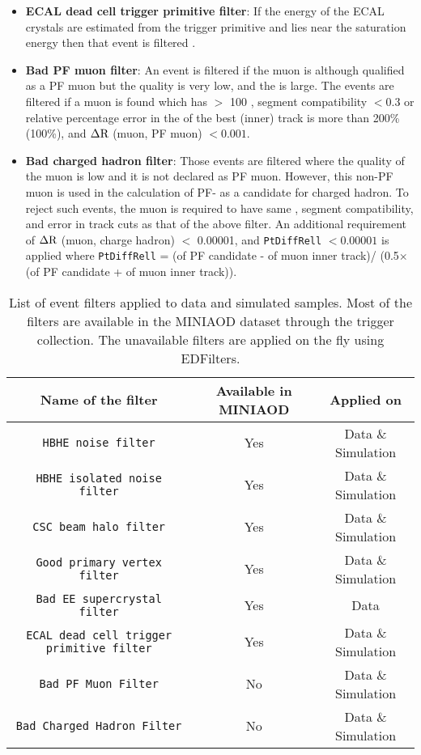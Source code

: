 \begin{itemize}[leftmargin=*]
	\item \textbf{ECAL dead cell trigger primitive filter}: If the energy of
		the ECAL crystals are estimated from the trigger primitive and
		lies near the saturation energy then that event is filtered
		\cite{metFilters}.
	\item \textbf{Bad PF muon filter}: An event is filtered if the muon is
		although qualified as a PF muon but the quality is very low, and
		the \pt is large. The events are filtered if a muon is found
		which has \pt $>$ 100 \GeV, segment compatibility $< 0.3$ or relative
		percentage error in the \pt of the best (inner) track is more than
		200\% (100\%), and $\Delta \rm R$ (muon, PF muon) $< 0.001$.
	\item \textbf{Bad charged hadron filter}: Those events are filtered where
		the quality of the muon is low and it is not declared as PF muon.
		However, this non-PF muon is used in the calculation of PF-\MET
		as a candidate for charged hadron. To reject such events, the muon
		is required to have same \pt, segment compatibility, and error in
		track cuts as that of the above filter. An additional requirement
    of $\Delta \rm R$ (muon, charge hadron) $<$ 0.00001, and \verb|PtDiffRell|
		$< 0.00001$ is applied where \verb|PtDiffRell| =
		(\pt of PF candidate - \pt of muon inner track)/
		(0.5$\times$ (\pt of PF candidate + \pt of muon inner track)).
\end{itemize}

\begin{table}
\caption{ List of event filters applied to data and simulated samples. Most of the filters
	are available in the MINIAOD dataset through the trigger collection. The
	unavailable filters are applied on the fly using EDFilters.}
\label{tab:eventFilters}
\centering
\begin{adjustbox}{max width=\textwidth}
 \begin{tabular}{ccc}\hline\hline
  {\bf{Name of the filter}} & {\bf{Available in MINIAOD}} & {\bf{Applied on}}\\\hline\hline
  \verb|HBHE noise filter|            & Yes & Data \& Simulation \\
  \verb|HBHE isolated noise filter|   & Yes & Data \& Simulation \\
  \verb|CSC beam halo filter|         & Yes & Data \& Simulation \\
  \verb|Good primary vertex filter|   & Yes & Data \& Simulation \\
  \verb|Bad EE supercrystal filter|   & Yes & Data  \\
  \verb|ECAL dead cell trigger primitive filter| & Yes & Data \& Simulation\\
  \verb|Bad PF Muon Filter|  & No & Data \& Simulation \\
  \verb|Bad Charged Hadron Filter|        & No & Data \& Simulation \\\hline
 \end{tabular}
\end{adjustbox}
\end{table}

